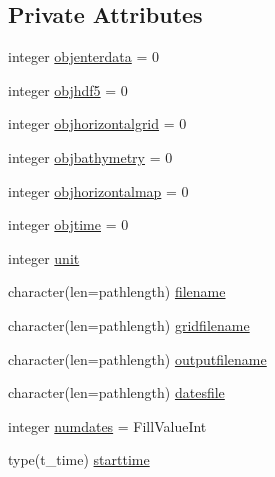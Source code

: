 \subsection*{Private Attributes}
\begin{DoxyCompactItemize}
\item 
integer \mbox{\hyperlink{structmodulecowamaasciiwind_1_1t__cowamaasciiwind_a4823e67eda4160d878146858ac68d98e}{objenterdata}} = 0
\item 
integer \mbox{\hyperlink{structmodulecowamaasciiwind_1_1t__cowamaasciiwind_a7346d5546d5b384923ac29f5feca5e63}{objhdf5}} = 0
\item 
integer \mbox{\hyperlink{structmodulecowamaasciiwind_1_1t__cowamaasciiwind_ae91da807a69cca7a68f12aa57e764baa}{objhorizontalgrid}} = 0
\item 
integer \mbox{\hyperlink{structmodulecowamaasciiwind_1_1t__cowamaasciiwind_a19f8b07022b00eb8d9fc7c335218a971}{objbathymetry}} = 0
\item 
integer \mbox{\hyperlink{structmodulecowamaasciiwind_1_1t__cowamaasciiwind_a958a06db06af37efceceb93581b74234}{objhorizontalmap}} = 0
\item 
integer \mbox{\hyperlink{structmodulecowamaasciiwind_1_1t__cowamaasciiwind_aa6d84d2689dbd00804c7dcec15ec8006}{objtime}} = 0
\item 
integer \mbox{\hyperlink{structmodulecowamaasciiwind_1_1t__cowamaasciiwind_a2e868d386b34c758d6a9474cd92e9be1}{unit}}
\item 
character(len=pathlength) \mbox{\hyperlink{structmodulecowamaasciiwind_1_1t__cowamaasciiwind_a63d4a167b277af452d1d0dfd0e9347af}{filename}}
\item 
character(len=pathlength) \mbox{\hyperlink{structmodulecowamaasciiwind_1_1t__cowamaasciiwind_a776f134dffdae5d86b804420fcf5584a}{gridfilename}}
\item 
character(len=pathlength) \mbox{\hyperlink{structmodulecowamaasciiwind_1_1t__cowamaasciiwind_a803ce8f9226d12eca512ca8e2dad28b7}{outputfilename}}
\item 
character(len=pathlength) \mbox{\hyperlink{structmodulecowamaasciiwind_1_1t__cowamaasciiwind_a98c6c04853d7ca2a176322ae4757c43f}{datesfile}}
\item 
integer \mbox{\hyperlink{structmodulecowamaasciiwind_1_1t__cowamaasciiwind_a7bfe02b2b0cfb913e8294bb4a871ab66}{numdates}} = Fill\+Value\+Int
\item 
type(t\+\_\+time) \mbox{\hyperlink{structmodulecowamaasciiwind_1_1t__cowamaasciiwind_a080c3eec0110b7414f8dda311549802b}{starttime}}

\end{DoxyCompactItemize}
